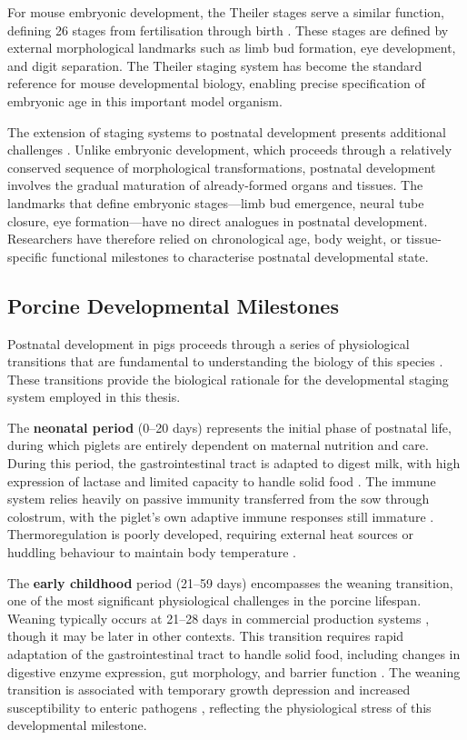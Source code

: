 For mouse embryonic development, the Theiler stages serve a similar function, defining 26 stages from fertilisation through birth \parencite{theiler_house_1989}. These stages are defined by external morphological landmarks such as limb bud formation, eye development, and digit separation. The Theiler staging system has become the standard reference for mouse developmental biology, enabling precise specification of embryonic age in this important model organism.

The extension of staging systems to postnatal development presents additional challenges \parencite{boeyer_evidence_2020}. Unlike embryonic development, which proceeds through a relatively conserved sequence of morphological transformations, postnatal development involves the gradual maturation of already-formed organs and tissues. The landmarks that define embryonic stages---limb bud emergence, neural tube closure, eye formation---have no direct analogues in postnatal development. Researchers have therefore relied on chronological age, body weight, or tissue-specific functional milestones to characterise postnatal developmental state.

\subsection{Porcine Developmental Milestones}

Postnatal development in pigs proceeds through a series of physiological transitions that are fundamental to understanding the biology of this species \parencite{swindle_swine_2012}. These transitions provide the biological rationale for the developmental staging system employed in this thesis.

The \textbf{neonatal period} (0--20 days) represents the initial phase of postnatal life, during which piglets are entirely dependent on maternal nutrition and care. During this period, the gastrointestinal tract is adapted to digest milk, with high expression of lactase and limited capacity to handle solid food \parencite{lalles_nutritional_2007}. The immune system relies heavily on passive immunity transferred from the sow through colostrum, with the piglet's own adaptive immune responses still immature \parencite{mair_porcine_2014}. Thermoregulation is poorly developed, requiring external heat sources or huddling behaviour to maintain body temperature \parencite{swindle_swine_2012}.

The \textbf{early childhood} period (21--59 days) encompasses the weaning transition, one of the most significant physiological challenges in the porcine lifespan. Weaning typically occurs at 21--28 days in commercial production systems \parencite{pluske_gastrointestinal_2018}, though it may be later in other contexts. This transition requires rapid adaptation of the gastrointestinal tract to handle solid food, including changes in digestive enzyme expression, gut morphology, and barrier function \parencite{pluske_gastrointestinal_2018}. The weaning transition is associated with temporary growth depression and increased susceptibility to enteric pathogens \parencite{pluske_factors_1997, lalles_nutritional_2007}, reflecting the physiological stress of this developmental milestone.

